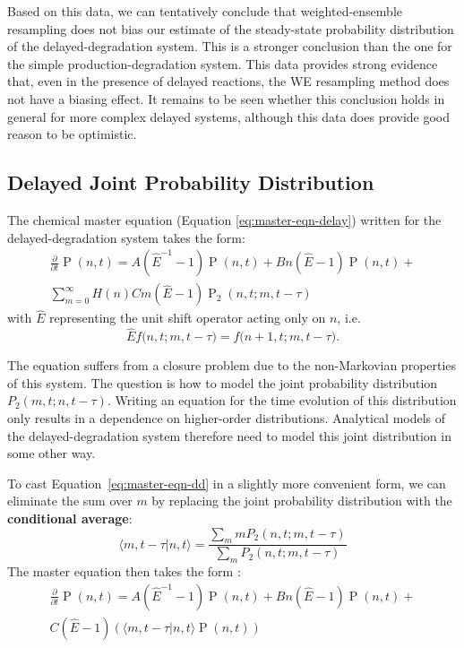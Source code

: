 \documentclass[english,letterpaper,12pt]{report}
\newcommand{\defkeywd}[1]{\textbf{#1}}
\DeclareMathOperator{\Prob}{P}
\begin{document}
\begin{doublespacing}
Based on this data, we can tentatively conclude that weighted-ensemble resampling does not bias our estimate of the steady-state probability distribution of the delayed-degradation system. This is a stronger conclusion than the one for the simple production-degradation system. This data provides strong evidence that, even in the presence of delayed reactions, the WE resampling method does not have a biasing effect. It remains to be seen whether this conclusion holds in general for more complex delayed systems, although this data does provide good reason to be optimistic.


\subsection{Delayed Joint Probability Distribution} %
\label{sub:delayed-joint-dist}
The chemical master equation (Equation \eqref{eq:master-eqn-delay}) written for the delayed-degradation system takes the form:
\begin{multline}
    \frac{\partial}{\partial t} \Prob(n, t) = A(\hat{E}^{-1} - 1) \Prob(n, t) + B n(\hat{E} - 1) \Prob(n, t) + \\
    \sum_{m=0}^{\infty} H(n) C m (\hat{E} - 1) \Prob_2(n, t; m, t - \tau)
    \label{eq:master-eqn-dd}
\end{multline}
with $\hat{E}$ representing the unit shift operator acting only on $n$, i.e.
\[
    \hat{E}{f(n,t;} {m,t-\tau)} = {f(n+1,t;} {m,t-\tau)}.
\]

The equation suffers from a closure problem due to the non-Markovian properties of this system. The question is how to model the joint probability distribution $P_2(m,t; n, t - \tau)$. Writing an equation for the time evolution of this distribution only results in a dependence on higher-order distributions. Analytical models of the delayed-degradation system therefore need to model this joint distribution in some other way.

To cast Equation~\eqref{eq:master-eqn-dd} in a slightly more convenient form, we can eliminate the sum over $m$ by replacing the joint probability distribution with the \defkeywd{conditional average}:
\begin{equation}
    \langle m, t - \tau | n, t \rangle = \frac{\sum_m m P_2(n, t; m, t - \tau)}{\sum_m P_2(n, t; m, t - \tau) }
    \label{eq:cond-avg-def}
\end{equation}
The master equation then takes the form \cite{delayed-deg-notes}:
\begin{multline}
    \frac{\partial}{\partial t} \Prob(n, t) = A(\hat{E}^{-1} - 1) \Prob(n, t) + B n(\hat{E} - 1) \Prob(n, t) + \\
    C (\hat{E} - 1) (\langle m, t - \tau | n, t \rangle \Prob(n, t))
    \label{eq:master-eqn-dd-ca}
\end{multline}


\end{doublespacing}
\end{document}
